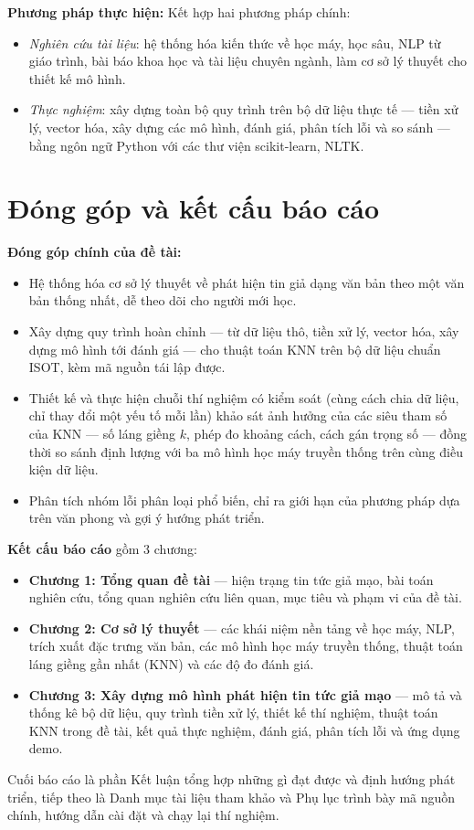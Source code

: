 \textbf{Phương pháp thực hiện:} Kết hợp hai phương pháp chính:

\begin{itemize}
    \item \textit{Nghiên cứu tài liệu}: hệ thống hóa kiến thức về học máy, học sâu, NLP từ giáo trình, bài báo khoa học và tài liệu chuyên ngành, làm cơ sở lý thuyết cho thiết kế mô hình.
    \item \textit{Thực nghiệm}: xây dựng toàn bộ quy trình trên bộ dữ liệu thực tế --- tiền xử lý, vector hóa, xây dựng các mô hình, đánh giá, phân tích lỗi và so sánh --- bằng ngôn ngữ Python với các thư viện scikit-learn, NLTK.
\end{itemize}

\section{Đóng góp và kết cấu báo cáo}

\textbf{Đóng góp chính của đề tài:}

\begin{itemize}
    \item Hệ thống hóa cơ sở lý thuyết về phát hiện tin giả dạng văn bản theo một văn bản thống nhất, dễ theo dõi cho người mới học.
    \item Xây dựng quy trình hoàn chỉnh --- từ dữ liệu thô, tiền xử lý, vector hóa, xây dựng mô hình tới đánh giá --- cho thuật toán KNN trên bộ dữ liệu chuẩn ISOT, kèm mã nguồn tái lập được.
    \item Thiết kế và thực hiện chuỗi thí nghiệm có kiểm soát (cùng cách chia dữ liệu, chỉ thay đổi một yếu tố mỗi lần) khảo sát ảnh hưởng của các siêu tham số của KNN --- số láng giềng $k$, phép đo khoảng cách, cách gán trọng số --- đồng thời so sánh định lượng với ba mô hình học máy truyền thống trên cùng điều kiện dữ liệu.
    \item Phân tích nhóm lỗi phân loại phổ biến, chỉ ra giới hạn của phương pháp dựa trên văn phong và gợi ý hướng phát triển.
\end{itemize}

\textbf{Kết cấu báo cáo} gồm 3 chương:

\begin{itemize}
    \item \textbf{Chương 1: Tổng quan đề tài} --- hiện trạng tin tức giả mạo, bài toán nghiên cứu, tổng quan nghiên cứu liên quan, mục tiêu và phạm vi của đề tài.
    \item \textbf{Chương 2: Cơ sở lý thuyết} --- các khái niệm nền tảng về học máy, NLP, trích xuất đặc trưng văn bản, các mô hình học máy truyền thống, thuật toán láng giềng gần nhất (KNN) và các độ đo đánh giá.
    \item \textbf{Chương 3: Xây dựng mô hình phát hiện tin tức giả mạo} --- mô tả và thống kê bộ dữ liệu, quy trình tiền xử lý, thiết kế thí nghiệm, thuật toán KNN trong đề tài, kết quả thực nghiệm, đánh giá, phân tích lỗi và ứng dụng demo.
\end{itemize}

Cuối báo cáo là phần Kết luận tổng hợp những gì đạt được và định hướng phát triển, tiếp theo là Danh mục tài liệu tham khảo và Phụ lục trình bày mã nguồn chính, hướng dẫn cài đặt và chạy lại thí nghiệm.
